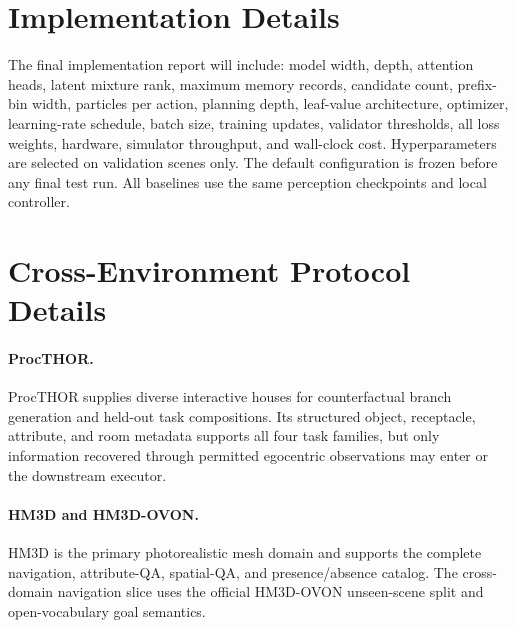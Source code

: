 \section{Implementation Details}
\label{app:implementation}

The final implementation report will include:
model width, depth, attention heads, latent mixture rank, maximum memory records, candidate count, prefix-bin width, particles per action, planning depth, leaf-value architecture, optimizer, learning-rate schedule, batch size, training updates, validator thresholds, all loss weights, hardware, simulator throughput, and wall-clock cost.
Hyperparameters are selected on validation scenes only.
The default configuration is frozen before any final test run.
All baselines use the same perception checkpoints and local controller.

\begin{table}[h]
  \centering
  \caption{\textbf{Implementation configuration.}
  Every value is to be read from the released experiment configuration rather than transcribed manually.}
  \label{tab:hyperparameters}
\end{table}

\section{Cross-Environment Protocol Details}
\label{app:cross-environment}

\paragraph{ProcTHOR.}
ProcTHOR supplies diverse interactive houses for counterfactual branch generation and held-out task compositions.
Its structured object, receptacle, attribute, and room metadata supports all four task families, but only information recovered through permitted egocentric observations may enter \rfm{} or the downstream executor.

\paragraph{HM3D and HM3D-OVON.}
HM3D is the primary photorealistic mesh domain and supports the complete navigation, attribute-QA, spatial-QA, and presence/absence catalog.
The cross-domain navigation slice uses the official HM3D-OVON unseen-scene split and open-vocabulary goal semantics.

